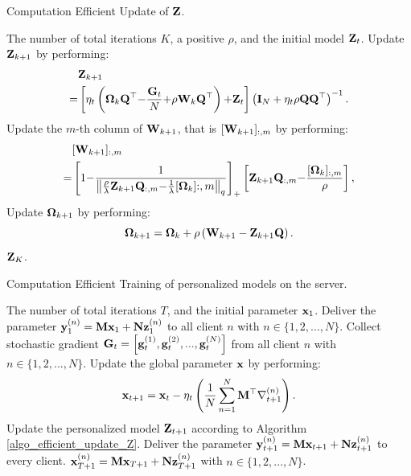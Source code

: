 \documentclass[journal]{IEEEtran}
\newcommand\algotext[1]{\end{algorithmic}#1\begin{algorithmic}[1]}
\begin{document}
\begin{algorithm}[!]
    \caption{Computation Efficient Update of ${\bf Z}$.}
    \label{algo_efficient_update_Z}
    \begin{algorithmic}[1]
        \Require The number of total iterations $K$, a positive $\rho$, and the initial model ${\bf Z}_t$.
            \State Update ${\bf Z}_{k+1}$ by performing:
            \begin{align}
            \nonumber
            & {\bf Z}_{k+1} \\ \nonumber
            = & \left [ \eta_t\left( \boldsymbol{\Omega}_k{\bf Q}^\top\mathrm{-}\frac{{\bf G}_t}{N}\mathrm{+}\rho{\bf W}_k{\bf Q}^\top \right)\mathrm{+}{\bf Z}_t \right ]\left( {\bf I}_N+\eta_t\rho{\bf Q}{\bf Q}^\top \right)^{-1}.
            \end{align}
            \State Update the $m$-th column of ${\bf W}_{k+1}$, that is $[{\bf W}_{k+1}]_{:,m}$ by performing:
            \begin{align}
	   \nonumber
	   & [{\bf W}_{k+1}]_{:,m} \\ \nonumber
	   \mathrm{=}& \left [1\mathrm{-} \frac{1}{\left\lVert\frac{\rho}{\lambda} 		          {\bf Z}_{k+1}{\bf Q}_{:, m} \mathrm{-} \frac{1}{\lambda}[\boldsymbol{\Omega}_k]{:, m}\right\rVert_q}\right]_\mathrm{+} \left[ {\bf Z}_{k+1}{\bf Q}_{:, m} \mathrm{-} \frac{[\boldsymbol{\Omega}_k]_{:, m}}{\rho}\right],
	\end{align} 
           \State Update $\boldsymbol{\Omega}_{k+1}$ by performing:
            $$\boldsymbol{\Omega}_{k+1}  = \boldsymbol{\Omega}_k + \rho \left( {\bf W}_{k+1} - {\bf Z}_{k+1}{\bf Q} \right).$$
            \State \EndFor
        \Return ${\bf Z}_K$.
      \end{algorithmic}
\end{algorithm}

\begin{algorithm}[!]
    \caption{Computation Efficient Training of personalized models on the server.}
    \label{algo_xxx}
    \begin{algorithmic}[1]
        \Require The number of total iterations $T$, and the initial parameter ${\bf x}_1$.
        \State Deliver the parameter ${\bf y}_1^{(n)} = {\bf M}{\bf x}_1 + {\bf N}{\bf z}_1^{(n)}$ to all client $n$ with $n\in\{1,2, ..., N\}$.
            \State Collect stochastic gradient ${\bf G}_t = \left [ {\bf g}_t^{(1)}, {\bf g}_t^{(2)}, ..., {\bf g}_t^{(N)} \right ]$ from all client $n$ with $n\in\{1,2, ..., N\}$.
            \State Update the global parameter ${\bf x}$ by performing:
            $$ {\bf x}_{t+1} = {\bf x}_t - \eta_t \left( \frac{1}{N}\sum_{n=1}^N{\bf M}^\top\nabla_{t+1}^{(n)} \right). $$
           \State Update the personalized model ${\bf Z}_{t+1}$ according to Algorithm \ref{algo_efficient_update_Z}.
            \State Deliver the parameter ${\bf y}_{t+1}^{(n)} = {\bf M}{\bf x}_{t+1} + {\bf N}{\bf z}_{t+1}^{(n)}$ to every client.
        \EndFor
        \Return ${\bf x}_{T+1}^{(n)} = {\bf M}{\bf x}_{T+1} + {\bf N}{\bf z}_{T+1}^{(n)}$ with $n\in\{1,2, ..., N\}$.
      \end{algorithmic}
\end{algorithm} 
\end{document}
